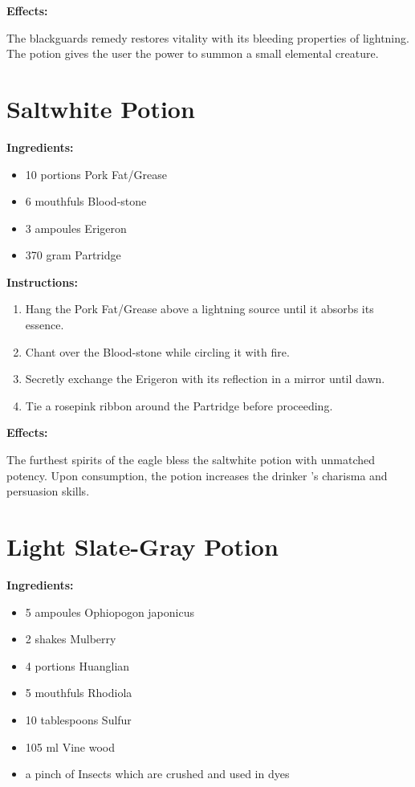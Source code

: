 \documentclass{article}
\begin{document}
\textbf{Effects:}

The blackguards remedy restores vitality with its bleeding properties of lightning. The potion gives the user the power to summon a small elemental creature.

\newpage
\section*{Saltwhite Potion}

\textbf{Ingredients:}

\begin{itemize}
  \item 10 portions Pork Fat/Grease
  \item 6 mouthfuls Blood-stone
  \item 3 ampoules Erigeron
  \item 370 gram Partridge
\end{itemize}

\textbf{Instructions:}

\begin{enumerate}
  \item Hang the Pork Fat/Grease above a lightning source until it absorbs its essence.
  \item Chant over the Blood-stone while circling it with fire.
  \item Secretly exchange the Erigeron with its reflection in a mirror until dawn.
  \item Tie a rosepink ribbon around the Partridge before proceeding.
\end{enumerate}

\textbf{Effects:}

The furthest spirits of the eagle bless the saltwhite potion with unmatched potency. Upon consumption, the potion increases the drinker 's charisma and persuasion skills.

\newpage
\section*{Light Slate-Gray Potion}

\textbf{Ingredients:}

\begin{itemize}
  \item 5 ampoules Ophiopogon japonicus
  \item 2 shakes Mulberry
  \item 4 portions Huanglian
  \item 5 mouthfuls Rhodiola
  \item 10 tablespoons Sulfur
  \item 105 ml Vine wood
  \item a pinch of Insects which are crushed and used in dyes
\end{itemize}
\end{document}
